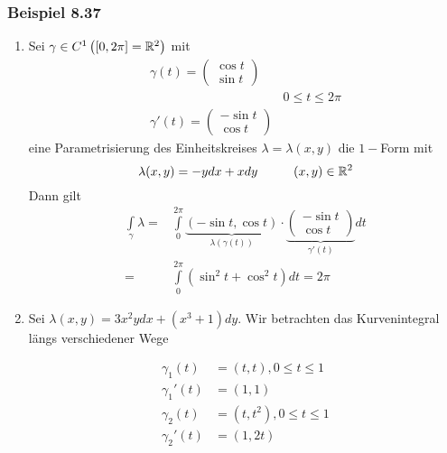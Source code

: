 \subsubsection*{Beispiel 8.37}
\begin{enumerate}
\item Sei $\gamma\in C^1\left(\lbrack 0,2\pi\rbrack =\mathbb{R}^2\right)$ mit
\[\begin{array}{*{20}{c}}
{\gamma (t) = \left( {\begin{array}{*{20}{c}}
{\cos t}\\
{\sin t}
\end{array}} \right)}&{}\\
{}&{0 \le t \le 2\pi }\\
{\gamma '(t) = \left( {\begin{array}{*{20}{c}}
{ - \sin t}\\
{\cos t}
\end{array}} \right)}&{}
\end{array}\]
eine Parametrisierung des Einheitskreises $\lambda = \lambda (x,y)$ die $1-$Form mit \[\lambda (x,y)=-ydx+xdy\hspace{10mm}(x,y)\in\R^2\]
Dann gilt
\begin{align*}
\int\limits_\gamma  \lambda   = &\int\limits_0^{2\pi } {\underbrace {\left( { - \sin t,\cos t} \right)}_{\lambda (\gamma (t))} \cdot \underbrace {\left( {\begin{array}{*{20}{c}}
{ - \sin t}\\
{\cos t}
\end{array}} \right)}_{\gamma '(t)}dt} \\
= &\int\limits_0^{2\pi } {\left( {{{\sin }^2}t + {{\cos }^2}t} \right)dt}  = 2\pi
\end{align*}
\item Sei $\lambda (x,y)=3x^2ydx + \left( x^3+1\right)dy$. Wir betrachten das Kurvenintegral längs verschiedener Wege
\begin{multicols}{2}
\begin{align*}
\gamma_1(t)&=(t,t), 0\leq t\leq 1\\
\gamma_1'(t)&=(1,1)\\
\gamma_2(t)&=(t,t^2), 0\leq t\leq 1\\
\gamma_2'(t)&=(1,2t)\\
\end{align*}
\null\vfill
\columnbreak
\begin{center}
\end{center}
\end{multicols}
\end{enumerate}
